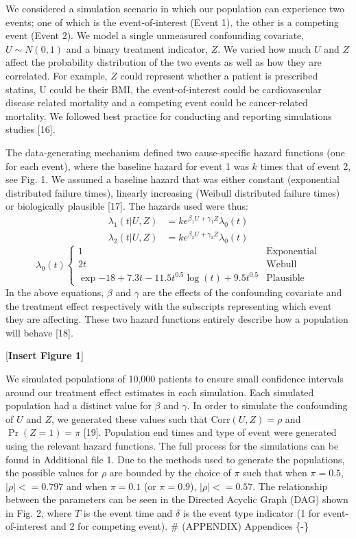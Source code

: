 \documentclass[
]{article}
\begin{document}
We considered a simulation scenario in which our population can experience two events; one of which is the event-of-interest (Event 1), the other is a competing event (Event 2). We model a single unmeasured confounding covariate, \(U \sim N (0,1)\) and a binary treatment indicator, \(Z\). We varied how much \(U\) and \(Z\) affect the probability distribution of the two events as well as how they are correlated. For example, \(Z\) could represent whether a patient is prescribed statins, U could be their BMI, the event-of-interest could be cardiovascular disease related mortality and a competing event could be cancer-related mortality. We followed best practice for conducting and reporting simulations studies {[}16{]}.

The data-generating mechanism defined two cause-specific hazard functions (one for each event), where the baseline hazard for event 1 was \(k\) times that of event 2, see Fig. 1. We assumed a baseline hazard that was either constant (exponential distributed failure times), linearly increasing (Weibull distributed failure times) or biologically plausible {[}17{]}. The hazards used were thus:
\begin{align}
\lambda_1(t|U,Z) &= ke^{\beta_1U + \gamma_1Z}\lambda_0(t)\\
\lambda_2(t|U,Z) &= ke^{\beta_2U + \gamma_2Z}\lambda_0(t)
\end{align}
\begin{equation}
\lambda_0(t) \begin{cases}
1 & \textrm{Exponential}\\
2t & \textrm{Webull}\\
\exp{-18+7.3t-11.5t^{0.5}\log(t) + 9.5t^{0.5}} & \textrm{Plausible}
\end{cases}
\end{equation}
In the above equations, \(\beta\) and \(\gamma\) are the effects of the confounding covariate and the treatment effect respectively with the subscripts representing which event they are affecting. These two hazard functions entirely describe how a population will behave {[}18{]}.

{[}\textbf{Insert Figure 1}{]}

We simulated populations of 10,000 patients to ensure small confidence intervals around our treatment effect estimates in each simulation. Each simulated population had a distinct value for \(\beta\) and \(\gamma\). In order to simulate the confounding of \(U\) and \(Z\), we generated these values such that \(\textrm{Corr}(U,Z) = \rho\) and \(\Pr(Z = 1) = \pi\) {[}19{]}. Population end times and type of event were generated using the relevant hazard functions. The full process for the simulations can be found in Additional file 1. Due to the methods used to generate the populations, the possible values for \(\rho\) are bounded by the choice of \(\pi\) such that when \(\pi = 0.5\), \(\left|\rho\right| <= 0.797\) and when \(\pi = 0.1\) (or \(\pi=0.9\)), \(\left|\rho\right| <= 0.57\). The relationship between the parameters can be seen in the Directed Acyclic Graph (DAG) shown in Fig. 2, where \(T\) is the event time and \(\delta\) is the event type indicator (1 for event-of-interest and 2 for competing event).
\# (APPENDIX) Appendices \{-\}
\end{document}
